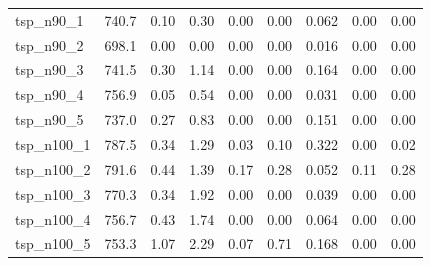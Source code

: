 \begin{longtable}{lrrrrrrrr}
tsp\_n90\_1 & 740.7 & 0.10 & 0.30 & 0.00 & 0.00 & 0.062 & 0.00 & 0.00 \\
tsp\_n90\_2 & 698.1 & 0.00 & 0.00 & 0.00 & 0.00 & 0.016 & 0.00 & 0.00 \\
tsp\_n90\_3 & 741.5 & 0.30 & 1.14 & 0.00 & 0.00 & 0.164 & 0.00 & 0.00 \\
tsp\_n90\_4 & 756.9 & 0.05 & 0.54 & 0.00 & 0.00 & 0.031 & 0.00 & 0.00 \\
tsp\_n90\_5 & 737.0 & 0.27 & 0.83 & 0.00 & 0.00 & 0.151 & 0.00 & 0.00 \\
tsp\_n100\_1 & 787.5 & 0.34 & 1.29 & 0.03 & 0.10 & 0.322 & 0.00 & 0.02 \\
tsp\_n100\_2 & 791.6 & 0.44 & 1.39 & 0.17 & 0.28 & 0.052 & 0.11 & 0.28 \\
tsp\_n100\_3 & 770.3 & 0.34 & 1.92 & 0.00 & 0.00 & 0.039 & 0.00 & 0.00 \\
tsp\_n100\_4 & 756.7 & 0.43 & 1.74 & 0.00 & 0.00 & 0.064 & 0.00 & 0.00 \\
tsp\_n100\_5 & 753.3 & 1.07 & 2.29 & 0.07 & 0.71 & 0.168 & 0.00 & 0.00 \\
\bottomrule
\end{longtable}
